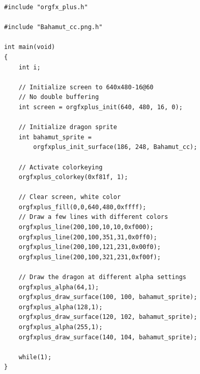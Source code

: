 \documentclass[10pt,a4paper]{article}
\begin{document}
\begin{lstlisting}
#include "orgfx_plus.h"

#include "Bahamut_cc.png.h"

int main(void)
{
    int i;

    // Initialize screen to 640x480-16@60
    // No double buffering
    int screen = orgfxplus_init(640, 480, 16, 0);

    // Initialize dragon sprite
    int bahamut_sprite =
        orgfxplus_init_surface(186, 248, Bahamut_cc);

    // Activate colorkeying
    orgfxplus_colorkey(0xf81f, 1);

    // Clear screen, white color
    orgfxplus_fill(0,0,640,480,0xffff);
    // Draw a few lines with different colors
    orgfxplus_line(200,100,10,10,0xf000);
    orgfxplus_line(200,100,351,31,0x0ff0);
    orgfxplus_line(200,100,121,231,0x00f0);
    orgfxplus_line(200,100,321,231,0xf00f);
    
    // Draw the dragon at different alpha settings
    orgfxplus_alpha(64,1);
    orgfxplus_draw_surface(100, 100, bahamut_sprite);
    orgfxplus_alpha(128,1);
    orgfxplus_draw_surface(120, 102, bahamut_sprite);
    orgfxplus_alpha(255,1);
    orgfxplus_draw_surface(140, 104, bahamut_sprite);

    while(1);
}
\end{lstlisting}
\end{document}
